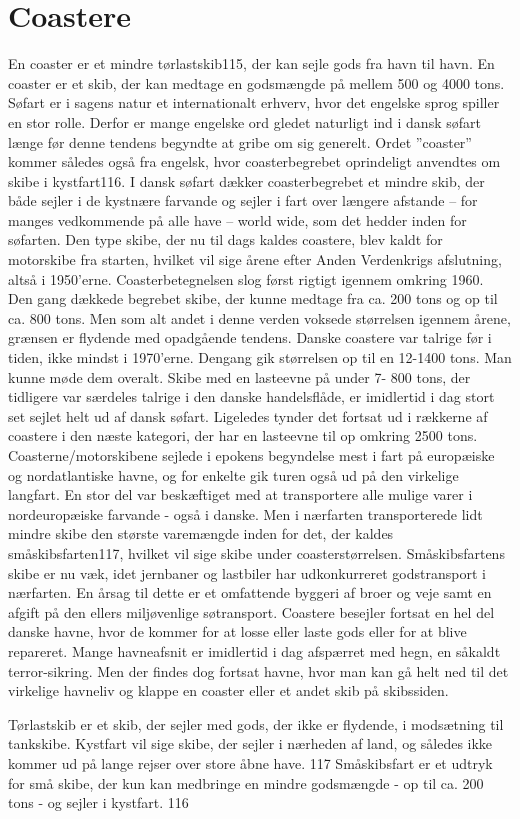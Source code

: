 \part{Coastere}\label{coastere}

En coaster er et mindre tørlastskib115, der kan sejle gods fra havn til
havn. En coaster er et skib, der kan medtage en godsmængde på mellem 500
og 4000 tons. Søfart er i sagens natur et internationalt erhverv, hvor
det engelske sprog spiller en stor rolle. Derfor er mange engelske ord
gledet naturligt ind i dansk søfart længe før denne tendens begyndte at
gribe om sig generelt. Ordet ''coaster'' kommer således også fra
engelsk, hvor coasterbegrebet oprindeligt anvendtes om skibe i
kystfart116. I dansk søfart dækker coasterbegrebet et mindre skib, der
både sejler i de kystnære farvande og sejler i fart over længere
afstande -- for manges vedkommende på alle have -- world wide, som det
hedder inden for søfarten. Den type skibe, der nu til dags kaldes
coastere, blev kaldt for motorskibe fra starten, hvilket vil sige årene
efter Anden Verdenkrigs afslutning, altså i 1950'erne.
Coasterbetegnelsen slog først rigtigt igennem omkring 1960. Den gang
dækkede begrebet skibe, der kunne medtage fra ca. 200 tons og op til ca.
800 tons. Men som alt andet i denne verden voksede størrelsen igennem
årene, grænsen er flydende med opadgående tendens. Danske coastere var
talrige før i tiden, ikke mindst i 1970'erne. Dengang gik størrelsen op
til en 12-1400 tons. Man kunne møde dem overalt. Skibe med en lasteevne
på under 7- 800 tons, der tidligere var særdeles talrige i den danske
handelsflåde, er imidlertid i dag stort set sejlet helt ud af dansk
søfart. Ligeledes tynder det fortsat ud i rækkerne af coastere i den
næste kategori, der har en lasteevne til op omkring 2500 tons.
Coasterne/motorskibene sejlede i epokens begyndelse mest i fart på
europæiske og nordatlantiske havne, og for enkelte gik turen også ud på
den virkelige langfart. En stor del var beskæftiget med at transportere
alle mulige varer i nordeuropæiske farvande - også i danske. Men i
nærfarten transporterede lidt mindre skibe den største varemængde inden
for det, der kaldes småskibsfarten117, hvilket vil sige skibe under
coasterstørrelsen. Småskibsfartens skibe er nu væk, idet jernbaner og
lastbiler har udkonkurreret godstransport i nærfarten. En årsag til
dette er et omfattende byggeri af broer og veje samt en afgift på den
ellers miljøvenlige søtransport. Coastere besejler fortsat en hel del
danske havne, hvor de kommer for at losse eller laste gods eller for at
blive repareret. Mange havneafsnit er imidlertid i dag afspærret med
hegn, en såkaldt terror-sikring. Men der findes dog fortsat havne, hvor
man kan gå helt ned til det virkelige havneliv og klappe en coaster
eller et andet skib på skibssiden.

Tørlastskib er et skib, der sejler med gods, der ikke er flydende, i
modsætning til tankskibe. Kystfart vil sige skibe, der sejler i nærheden
af land, og således ikke kommer ud på lange rejser over store åbne have.
117 Småskibsfart er et udtryk for små skibe, der kun kan medbringe en
mindre godsmængde - op til ca. 200 tons - og sejler i kystfart. 116
